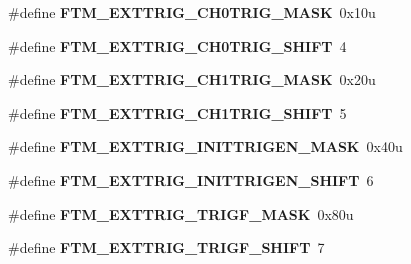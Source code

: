 \begin{DoxyCompactItemize}
\item 
\hypertarget{group___f_t_m___register___masks_ga8c677fe12d48d6f0c1b336df2aaff174}{}\#define {\bfseries F\+T\+M\+\_\+\+E\+X\+T\+T\+R\+I\+G\+\_\+\+C\+H0\+T\+R\+I\+G\+\_\+\+M\+A\+S\+K}~0x10u\label{group___f_t_m___register___masks_ga8c677fe12d48d6f0c1b336df2aaff174}

\item 
\hypertarget{group___f_t_m___register___masks_ga2c365c7c86ae305f243cd065d9bb9202}{}\#define {\bfseries F\+T\+M\+\_\+\+E\+X\+T\+T\+R\+I\+G\+\_\+\+C\+H0\+T\+R\+I\+G\+\_\+\+S\+H\+I\+F\+T}~4\label{group___f_t_m___register___masks_ga2c365c7c86ae305f243cd065d9bb9202}

\item 
\hypertarget{group___f_t_m___register___masks_ga5a26c6fcf0477c95760e13f68913b5de}{}\#define {\bfseries F\+T\+M\+\_\+\+E\+X\+T\+T\+R\+I\+G\+\_\+\+C\+H1\+T\+R\+I\+G\+\_\+\+M\+A\+S\+K}~0x20u\label{group___f_t_m___register___masks_ga5a26c6fcf0477c95760e13f68913b5de}

\item 
\hypertarget{group___f_t_m___register___masks_gab622ad237cfc1d00f20b317d23bff1ca}{}\#define {\bfseries F\+T\+M\+\_\+\+E\+X\+T\+T\+R\+I\+G\+\_\+\+C\+H1\+T\+R\+I\+G\+\_\+\+S\+H\+I\+F\+T}~5\label{group___f_t_m___register___masks_gab622ad237cfc1d00f20b317d23bff1ca}

\item 
\hypertarget{group___f_t_m___register___masks_ga71d3ac60b3056f50c6d22c8e3b2701bb}{}\#define {\bfseries F\+T\+M\+\_\+\+E\+X\+T\+T\+R\+I\+G\+\_\+\+I\+N\+I\+T\+T\+R\+I\+G\+E\+N\+\_\+\+M\+A\+S\+K}~0x40u\label{group___f_t_m___register___masks_ga71d3ac60b3056f50c6d22c8e3b2701bb}

\item 
\hypertarget{group___f_t_m___register___masks_ga910785e872df234670a45cf1b00ad7c3}{}\#define {\bfseries F\+T\+M\+\_\+\+E\+X\+T\+T\+R\+I\+G\+\_\+\+I\+N\+I\+T\+T\+R\+I\+G\+E\+N\+\_\+\+S\+H\+I\+F\+T}~6\label{group___f_t_m___register___masks_ga910785e872df234670a45cf1b00ad7c3}

\item 
\hypertarget{group___f_t_m___register___masks_gac6585f6c1888d29c05c5e8e3928d5a9e}{}\#define {\bfseries F\+T\+M\+\_\+\+E\+X\+T\+T\+R\+I\+G\+\_\+\+T\+R\+I\+G\+F\+\_\+\+M\+A\+S\+K}~0x80u\label{group___f_t_m___register___masks_gac6585f6c1888d29c05c5e8e3928d5a9e}

\item 
\hypertarget{group___f_t_m___register___masks_gae63a7bcedd63575b31712675d31475a2}{}\#define {\bfseries F\+T\+M\+\_\+\+E\+X\+T\+T\+R\+I\+G\+\_\+\+T\+R\+I\+G\+F\+\_\+\+S\+H\+I\+F\+T}~7\label{group___f_t_m___register___masks_gae63a7bcedd63575b31712675d31475a2}


\end{DoxyCompactItemize}
